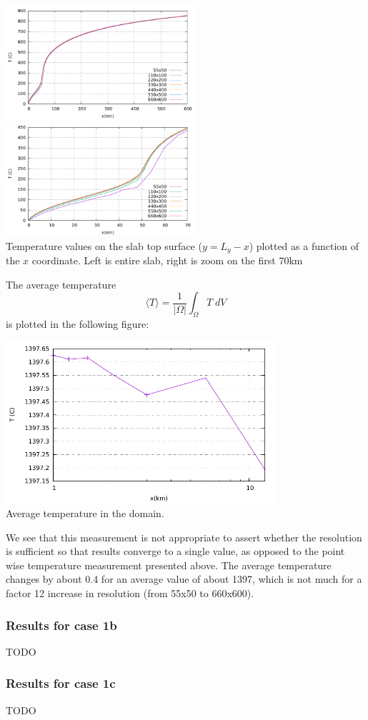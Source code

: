 \begin{center}
\includegraphics[width=7cm]{python_codes/fieldstone_45/images/tempdiag}
\includegraphics[width=7cm]{python_codes/fieldstone_45/images/tempdiag_zoom}\\
{\small Temperature values on the slab top surface ($y=L_y-x$) plotted as a function of the $x$ coordinate.
Left is entire slab, right is zoom on the first $70\text{km}$}
\end{center}

The average temperature 
\[
\langle T\rangle =\frac{1}{|\Omega|}\int_\Omega T \; dV
\]
is plotted in the following figure:
\begin{center}
\includegraphics[width=10cm]{python_codes/fieldstone_45/images/Tavrg.pdf}\\
{\small Average temperature in the domain.}
\end{center}
We see that this measurement is not 
appropriate to assert whether the resolution is sufficient so that results converge 
to a single value, as opposed to the point wise temperature measurement presented above.
The average temperature changes by about 0.4 for an average value of about 1397, which is 
not much for a factor 12 increase in resolution (from 55x50 to 660x600).



\subsubsection*{Results for case 1b}

TODO

\subsubsection*{Results for case 1c}

TODO







